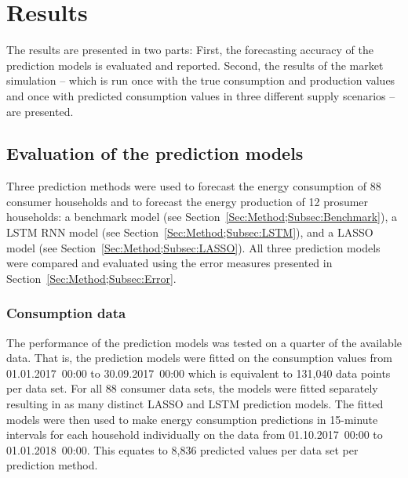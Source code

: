 
\section{Results}\label{Sec:Results}

The results are presented in two parts: First, the forecasting accuracy of the prediction models is evaluated and reported. Second, the results of the market simulation -- which is run once with the true consumption and production values and once with predicted consumption values in three different supply scenarios -- are presented.



\subsection{Evaluation of the prediction models}\label{Sec:Results;Subsec:Forecast}

Three prediction methods were used to forecast the energy consumption of 88 consumer households and to forecast the energy production of 12 prosumer households: a benchmark model (see Section~\ref{Sec:Method;Subsec:Benchmark}), a LSTM RNN model (see Section~\ref{Sec:Method;Subsec:LSTM}), and a LASSO model (see Section~\ref{Sec:Method;Subsec:LASSO}). All three prediction models were compared and evaluated using the error measures presented in Section~\ref{Sec:Method;Subsec:Error}.


\subsubsection{Consumption data}

The performance of the prediction models was tested on a quarter of the available data. That is, the prediction models were fitted on the consumption values from 01.01.2017~00:00 to 30.09.2017~00:00 which is equivalent to 131,040 data points per data set. For all 88 consumer data sets, the models were fitted separately resulting in as many distinct LASSO and LSTM prediction models. The fitted models were then used to make energy consumption predictions in 15-minute intervals for each household individually on the data from 01.10.2017~00:00 to 01.01.2018~00:00. This equates to 8,836 predicted values per data set per prediction method.

